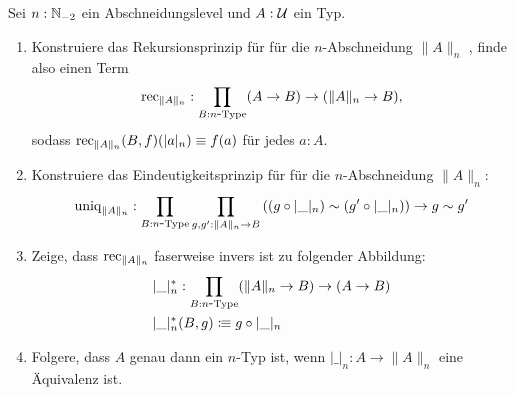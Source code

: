 \documentclass{uebung}
\begin{document}

\begin{exercise}
  Sei $n:\mathbb{N}_{-2}$ ein Abschneidungslevel und $A:\mathcal{U}$ ein Typ.
  \begin{enumerate}
    \item Konstruiere das Rekursionsprinzip für für die $n$-Abschneidung $\|A\|_n$ , finde also einen Term
      $$
      \mathrm{rec}_{\|A\|_n}:\prod_{B:n\mbox{-}\mathrm{Type}}(A \to B) \to (\|A\|_n \to B),
      $$
      sodass $\mathrm{rec}_{\|A\|_n}(B,f)(|a|_n) \equiv f(a)$ für jedes $a:A$.
    \item Konstruiere das Eindeutigkeitsprinzip für für die $n$-Abschneidung $\|A\|_n$:
      $$
      \mathrm{uniq}_{\|A\|_n}:\prod_{B:n\mbox{-}\mathrm{Type}}\prod_{g,g':\|A\|_n \to B} \left((g\circ |\_|_n) \sim (g'\circ |\_|_n)\right) \to g \sim g'
      $$
    \item Zeige, dass $\mathrm{rec}_{\|A\|_n}$ faserweise invers ist zu folgender Abbildung:
      \begin{align*}
        &|\_|_n^*:\prod_{B:n\mbox{-}\mathrm{Type}}(\|A\|_n \to B) \to (A \to B)\\
        &|\_|_n^*(B,g) \vcentcolon\mspace{-1.2mu}\equiv g \circ |\_|_n
      \end{align*}
    \item Folgere, dass $A$ genau dann ein $n$-Typ ist, wenn $|\_|_n:A\to \|A\|_n$ eine Äquivalenz ist.
  \end{enumerate}
\end{exercise}

\begin{exercise}
\end{exercise}
\end{document}
